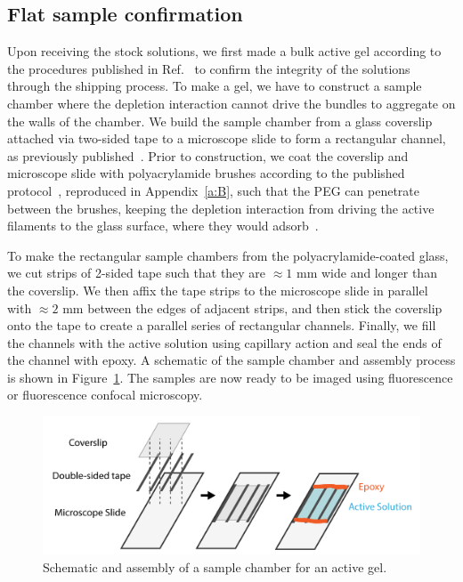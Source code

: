\subsection{Flat sample confirmation}
Upon receiving the stock solutions, we first made a bulk active gel according to the procedures published in Ref.~\cite{RN3} to confirm the integrity of the solutions through the shipping process.
To make a gel, we have to construct a sample chamber where the depletion interaction cannot drive the bundles to aggregate on the walls of the chamber.
We build the sample chamber from a glass coverslip attached via two-sided tape to a microscope slide to form a rectangular channel, as previously published~\cite{RN3}.
Prior to construction, we coat the coverslip and microscope slide with polyacrylamide brushes according to the published protocol~\cite{RN3}, reproduced in Appendix~\ref{a:B}, such that the PEG can penetrate between the brushes, keeping the depletion interaction from driving the active filaments to the glass surface, where they would adsorb~\cite{RN3}.

To make the rectangular sample chambers from the polyacrylamide-coated glass, we cut strips of 2-sided tape such that they are $\approx1$ mm wide and longer than the coverslip.
We then affix the tape strips to the microscope slide in parallel with $\approx 2$ mm between the edges of adjacent strips, and then stick the coverslip onto the tape to create a parallel series of rectangular channels.
Finally, we fill the channels with the active solution using capillary action and seal the ends of the channel with epoxy.
A schematic of the sample chamber and assembly process is shown in Figure~\ref{f:3-SampleChamber}.
The samples are now ready to be imaged using fluorescence or fluorescence confocal microscopy.
\begin{figure}
  \centering
  \includegraphics{figures/C3/Ch3-Figs_GelSampleChamber.png}
  \caption{Schematic and assembly of a sample chamber for an active gel.}
  \label{f:3-SampleChamber}
\end{figure}

